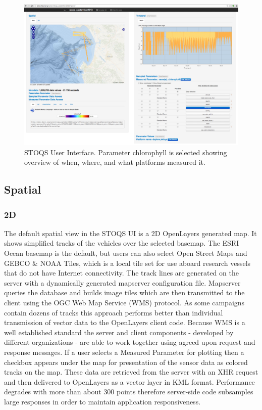 \documentclass[conference]{IEEEtran}
\begin{document}
\begin{figure}[htbp]
\centering
\includegraphics[width=6.6in]{STOQSscreencapture.png}
\caption{STOQS User Interface. Parameter chlorophyll is selected showing overview of when, where, and what platforms measured it.}
\label{fig:STOQSscreencapture}
\end{figure}

\subsection{Spatial}

\subsubsection{2D}
The default spatial view in the STOQS UI is a 2D OpenLayers generated map. It shows simplified tracks of the vehicles over the selected basemap. The ESRI Ocean basemap is the default, but users can also select Open Street Maps and GEBCO \& NOAA Tiles, which is a local tile set for use aboard research vessels that do not have Internet connectivity. The track lines are generated on the server with a dynamically generated mapserver configuration file. Mapserver queries the database and builds image tiles which are then transmitted to the client using the OGC Web Map Service (WMS) protocol. As some campaigns contain dozens of tracks this approach performs better than individual transmission of vector data to the OpenLayers client code. Because WMS is a well established standard the server and client components - developed by different organizations - are able to work together using agreed upon request and response messages. If a user selects a Measured Parameter for plotting then a checkbox appears under the map for presentation of the sensor data as colored tracks on the map. These data are retrieved from the server with an XHR request and then delivered to OpenLayers as a vector layer in KML format. Performance degrades with more than about 300 points therefore server-side code subsamples large responses in order to maintain application responsiveness.
\end{document}

